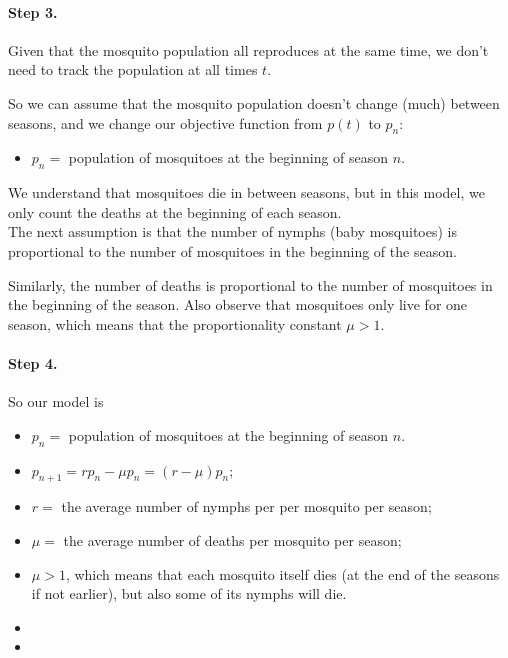 \begin{example}
\paragraph{Step 3.} Given that the mosquito population all reproduces at the same time, we don't need to track the population at all times $t$.

So we can assume that the mosquito population doesn't change (much) between seasons, and we change our objective function from $p(t)$ to $p_n$:
\begin{itemize}
	\item $p_n = $ population of mosquitoes at the beginning of season $n$.
\end{itemize}

We understand that mosquitoes die in between seasons, but in this model, we only count the deaths at the beginning of each season. \\

The next assumption is that the number of nymphs (baby mosquitoes) is proportional to the number of mosquitoes in the beginning of the season.

Similarly, the number of deaths is proportional to the number of mosquitoes in the beginning of the season. Also observe that mosquitoes only live for one season, which means that the proportionality constant $\mu > 1$.



\paragraph{Step 4.} So our model is
\begin{itemize}
	\item $p_n = $ population of mosquitoes at the beginning of season $n$.
	\item $p_{n+1} = r p_n - \mu p_n = (r-\mu)p_n$;
	\item $r = $ the average number of nymphs per per mosquito per season;
	\item $\mu = $ the average number of deaths per mosquito per season;
	\item $\mu > 1$, which means that each mosquito itself dies (at the end of the seasons if not earlier), but also some of its nymphs will die.
\end{itemize}

\end{example}

\begin{video}
\begin{itemize}
	\item {}
	\item {}
\end{itemize}	
\end{video}

